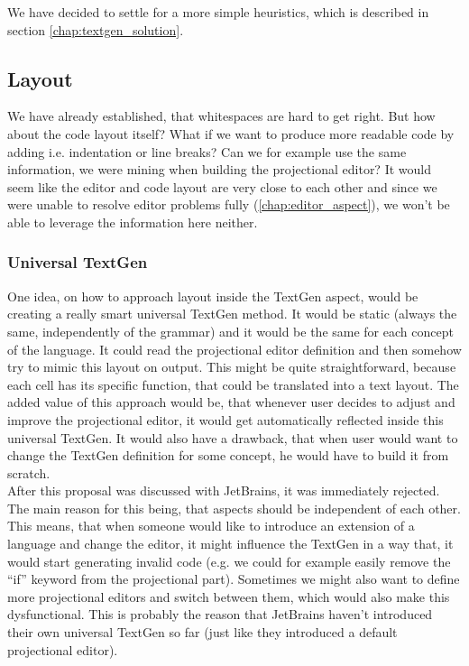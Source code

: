 We have decided to settle for a more simple heuristics, which is described in section \ref{chap:textgen_solution}.

\subsection{Layout}

We have already established, that whitespaces are hard to get right.
But how about the code layout itself?
What if we want to produce more readable code by adding i.e. indentation or line breaks?
Can we for example use the same information, we were mining when building the projectional editor?
It would seem like the editor and code layout are very close to each other and since we were unable to resolve editor problems fully (\ref{chap:editor_aspect}), we won't be able to leverage the information here neither.

\subsubsection{Universal TextGen}
One idea, on how to approach layout inside the TextGen aspect, would be creating a really smart universal TextGen method.
It would be static (always the same, independently of the grammar) and it would be the same for each concept of the language.
It could read the projectional editor definition and then somehow try to mimic this layout on output.
This might be quite straightforward, because each cell has its specific function, that could be translated into a text layout.
The added value of this approach would be, that whenever user decides to adjust and improve the projectional editor, it would get automatically reflected inside this universal TextGen.
It would also have a drawback, that when user would want to change the TextGen definition for some concept, he would have to build it from scratch.
\\

After this proposal was discussed with JetBrains, it was immediately rejected.
The main reason for this being, that aspects should be independent of each other.
This means, that when someone would like to introduce an extension of a language and change the editor, it might influence the TextGen in a way that, it would start generating invalid code (e.g. we could for example easily remove the “if” keyword from the projectional part).
Sometimes we might also want to define more projectional editors and switch between them, which would also make this dysfunctional.
This is probably the reason that JetBrains haven't introduced their own universal TextGen so far (just like they introduced a default projectional editor).

